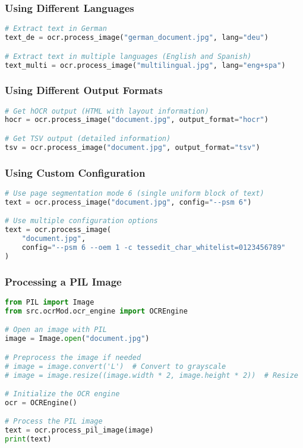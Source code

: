 \subsubsection{Using Different Languages}

\begin{lstlisting}[language=Python]
# Extract text in German
text_de = ocr.process_image("german_document.jpg", lang="deu")

# Extract text in multiple languages (English and Spanish)
text_multi = ocr.process_image("multilingual.jpg", lang="eng+spa")
\end{lstlisting}

\subsubsection{Using Different Output Formats}

\begin{lstlisting}[language=Python]
# Get hOCR output (HTML with layout information)
hocr = ocr.process_image("document.jpg", output_format="hocr")

# Get TSV output (detailed information)
tsv = ocr.process_image("document.jpg", output_format="tsv")
\end{lstlisting}

\subsubsection{Using Custom Configuration}

\begin{lstlisting}[language=Python]
# Use page segmentation mode 6 (single uniform block of text)
text = ocr.process_image("document.jpg", config="--psm 6")

# Use multiple configuration options
text = ocr.process_image(
    "document.jpg",
    config="--psm 6 --oem 1 -c tessedit_char_whitelist=0123456789"
)
\end{lstlisting}

\subsubsection{Processing a PIL Image}

\begin{lstlisting}[language=Python]
from PIL import Image
from src.ocrMod.ocr_engine import OCREngine

# Open an image with PIL
image = Image.open("document.jpg")

# Preprocess the image if needed
# image = image.convert('L')  # Convert to grayscale
# image = image.resize((image.width * 2, image.height * 2))  # Resize

# Initialize the OCR engine
ocr = OCREngine()

# Process the PIL image
text = ocr.process_pil_image(image)
print(text)
\end{lstlisting} 